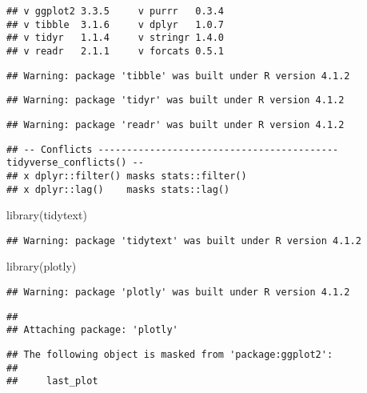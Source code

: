 \documentclass[
]{article}
\newenvironment{Shaded}{\begin{snugshade}}{\end{snugshade}}
\newcommand{\FunctionTok}[1]{\textcolor[rgb]{0.00,0.00,0.00}{#1}}
\newcommand{\NormalTok}[1]{#1}
\begin{document}
\begin{verbatim}
## v ggplot2 3.3.5     v purrr   0.3.4
## v tibble  3.1.6     v dplyr   1.0.7
## v tidyr   1.1.4     v stringr 1.4.0
## v readr   2.1.1     v forcats 0.5.1
\end{verbatim}

\begin{verbatim}
## Warning: package 'tibble' was built under R version 4.1.2
\end{verbatim}

\begin{verbatim}
## Warning: package 'tidyr' was built under R version 4.1.2
\end{verbatim}

\begin{verbatim}
## Warning: package 'readr' was built under R version 4.1.2
\end{verbatim}

\begin{verbatim}
## -- Conflicts ------------------------------------------ tidyverse_conflicts() --
## x dplyr::filter() masks stats::filter()
## x dplyr::lag()    masks stats::lag()
\end{verbatim}

\begin{Shaded}
\begin{Highlighting}[]
\FunctionTok{library}\NormalTok{(tidytext)}
\end{Highlighting}
\end{Shaded}

\begin{verbatim}
## Warning: package 'tidytext' was built under R version 4.1.2
\end{verbatim}

\begin{Shaded}
\begin{Highlighting}[]
\FunctionTok{library}\NormalTok{(plotly)}
\end{Highlighting}
\end{Shaded}

\begin{verbatim}
## Warning: package 'plotly' was built under R version 4.1.2
\end{verbatim}

\begin{verbatim}
## 
## Attaching package: 'plotly'
\end{verbatim}

\begin{verbatim}
## The following object is masked from 'package:ggplot2':
## 
##     last_plot
\end{verbatim}
\end{document}
